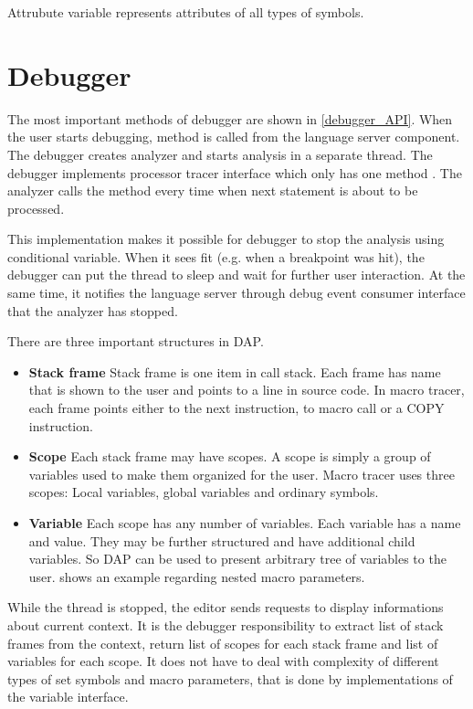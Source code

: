 Attrubute variable represents attributes of all types of symbols.

\section{Debugger}


The most important methods of debugger are shown in \cref{debugger_API}. When the user starts debugging, method  is called from the language server component. The debugger creates analyzer and starts analysis in a separate thread. The debugger implements processor tracer interface which only has one method . The analyzer calls the  method every time when next statement is about to be processed.

This implementation makes it possible for debugger to stop the analysis using conditional variable. When it sees fit (e.g. when a breakpoint was hit), the debugger can put the thread to sleep and wait for further user interaction. At the same time, it notifies the language server through debug event consumer interface that the analyzer has stopped.

There are three important structures in DAP.
\begin{itemize}
	\item \textbf{Stack frame} Stack frame is one item in call stack. Each frame has name that is shown to the user and points to a line in source code. In macro tracer, each frame points either to the next instruction, to macro call or a COPY instruction.
	\item \textbf{Scope} Each stack frame may have scopes. A scope is simply a group of variables used to make them organized for the user. Macro tracer uses three scopes: Local variables, global variables and ordinary symbols.
	\item \textbf{Variable} Each scope has any number of variables. Each variable has a name and value. They may be further structured and have additional child variables. So DAP can be used to present arbitrary tree of variables to the user.  shows an example regarding nested macro parameters.

\end{itemize}

While the thread is stopped, the editor sends requests to display informations about current context. It is the debugger responsibility to extract list of stack frames from the context, return list of scopes for each stack frame and list of variables for each scope. It does not have to deal with complexity of different types of set symbols and macro parameters, that is done by implementations of the variable interface.


